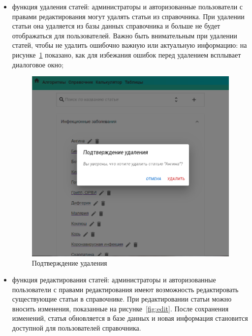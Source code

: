 \begin{itemize}
    \item функция удаления статей: администраторы и авторизованные пользователи с правами редактирования могут удалять статьи из справочника. При удалении статьи она удаляется из базы данных справочника и больше не будет отображаться для пользователей. Важно быть внимательным при удалении статей, чтобы не удалить ошибочно важную или актуальную информацию: на рисунке~\ref{fig:del} показано, как для избежания ошибок перед удалением всплывает диалоговое окно;

\begin{figure}
  \includegraphics[scale=0.6]{styles/diploma/inc/Удаление.png}
  \caption{Подтверждение удаления}
  \label{fig:del}
\end{figure} 

    \item функция редактирования статей: администраторы и авторизованные пользователи с правами редактирования имеют возможность редактировать существующие статьи в справочнике. При редактировании статьи можно вносить изменения, показанные на рисунке~\ref{fig:edit}. После сохранения изменений, статья обновляется в базе данных и новая информация становится доступной для пользователей справочника.
    

\end{itemize}
